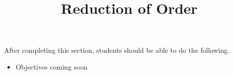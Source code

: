 \documentclass{ximera}
\title{Reduction of Order}
\begin{document}
\begin{abstract}
\end{abstract}

\maketitle

\begin{sectionOutcomes}

After completing this section, students should be able to do the following.

\begin{itemize}
	\item Objectives coming soon
\end{itemize}

\end{sectionOutcomes}
\end{document}
